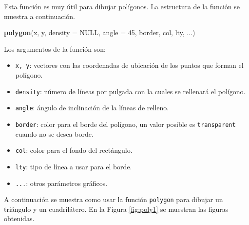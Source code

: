 \documentclass[10pt,]{krantz}
\makeatletter
\newenvironment{Shaded}{\begin{snugshade}}{\end{snugshade}}
\newcommand{\KeywordTok}[1]{\textcolor[rgb]{0.13,0.29,0.53}{\textbf{#1}}}
\newcommand{\DataTypeTok}[1]{\textcolor[rgb]{0.13,0.29,0.53}{#1}}
\newcommand{\DecValTok}[1]{\textcolor[rgb]{0.00,0.00,0.81}{#1}}
\newcommand{\OtherTok}[1]{\textcolor[rgb]{0.56,0.35,0.01}{#1}}
\newcommand{\NormalTok}[1]{#1}
\providecommand{\tightlist}{%
  \setlength{\itemsep}{0pt}\setlength{\parskip}{0pt}}
\newenvironment{kframe}{%
\medskip{}
\setlength{\fboxsep}{.8em}
 \def\at@end@of@kframe{}%
 \ifinner\ifhmode%
  \def\at@end@of@kframe{\end{minipage}}%
  \begin{minipage}{\columnwidth}%
 \fi\fi%
 \def\FrameCommand##1{\hskip\@totalleftmargin \hskip-\fboxsep
 \colorbox{shadecolor}{##1}\hskip-\fboxsep
     \hskip-\linewidth \hskip-\@totalleftmargin \hskip\columnwidth}%
 \MakeFramed {\advance\hsize-\width
   \@totalleftmargin\z@ \linewidth\hsize
   \@setminipage}}%
 {\par\unskip\endMakeFramed%
 \at@end@of@kframe}
\renewenvironment{Shaded}{\begin{kframe}}{\end{kframe}}
\makeatother
\begin{document}
Esta función es muy útil para dibujar polígonos. La estructura de la
función se muestra a continuación.

\begin{Shaded}
\begin{Highlighting}[]
\KeywordTok{polygon}\NormalTok{(x, y, }\DataTypeTok{density =} \OtherTok{NULL}\NormalTok{, }\DataTypeTok{angle =} \DecValTok{45}\NormalTok{,}
\NormalTok{        border, col, lty, ...)}
\end{Highlighting}
\end{Shaded}

Los argumentos de la función son:

\begin{itemize}
\tightlist
\item
  \texttt{x,\ y}: vectores con las coordenadas de ubicación de los
  puntos que forman el polígono.
\item
  \texttt{density}: número de líneas por pulgada con la cuales se
  rellenará el polígono.
\item
  \texttt{angle}: ángulo de inclinación de la líneas de relleno.
\item
  \texttt{border}: color para el borde del polígono, un valor posible es
  \texttt{\textquotesingle{}transparent\textquotesingle{}} cuando no se
  desea borde.
\item
  \texttt{col}: color para el fondo del rectángulo.
\item
  \texttt{lty}: tipo de línea a usar para el borde.
\item
  \texttt{...}: otros parámetros gráficos.
\end{itemize}

A continuación se muestra como usar la función \texttt{polygon} para
dibujar un triángulo y un cuadrilátero. En la Figura \ref{fig:poly1} se
muestran las figuras obtenidas.
\end{document}
